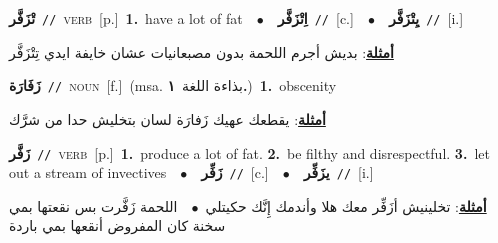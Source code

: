 \documentclass[10pt,a4paper,twoside]{article} %
\begin{document}
\begin{multicols}{2}
{\setlength\topsep{0pt}\textbf{\foreignlanguage{arabic}{تْزَفَّر}}\ {\color{gray}\texttt{//}\color{black}}\ \textsc{verb}\ [p.]\ \textbf{1.}~have a lot of fat\ \ $\bullet$\ \ \setlength\topsep{0pt}\textbf{\foreignlanguage{arabic}{اِتْزَفَّر}}\ {\color{gray}\texttt{//}\color{black}}\ [c.]\ \ $\bullet$\ \ \setlength\topsep{0pt}\textbf{\foreignlanguage{arabic}{يِتْزَفَّر}}\ {\color{gray}\texttt{//}\color{black}}\ [i.]\  \begin{flushright}\color{gray}\foreignlanguage{arabic}{\textbf{\underline{\foreignlanguage{arabic}{أمثلة}}}: بديش أجرم اللحمة بدون مصبعانيات عشان خايفة ايدي تِتْزَفَّر}\end{flushright}\color{black}} \vspace{2mm}

{\setlength\topsep{0pt}\textbf{\foreignlanguage{arabic}{زَفَارَة}}\ {\color{gray}\texttt{//}\color{black}}\ \textsc{noun}\ [f.]\ \color{gray}(msa. \foreignlanguage{arabic}{بذاءة اللغة}~\foreignlanguage{arabic}{\textbf{١.}})\color{black}\ \textbf{1.}~obscenity\  \begin{flushright}\color{gray}\foreignlanguage{arabic}{\textbf{\underline{\foreignlanguage{arabic}{أمثلة}}}: يقطعك عهيك زَفارَة لسان بتخليش حدا من شرَّك}\end{flushright}\color{black}} \vspace{2mm}

{\setlength\topsep{0pt}\textbf{\foreignlanguage{arabic}{زَفَّر}}\ {\color{gray}\texttt{//}\color{black}}\ \textsc{verb}\ [p.]\ \textbf{1.}~produce a lot of fat.  \textbf{2.}~be filthy and disrespectful.  \textbf{3.}~let out a stream of invectives\ \ $\bullet$\ \ \setlength\topsep{0pt}\textbf{\foreignlanguage{arabic}{زَفِّر}}\ {\color{gray}\texttt{//}\color{black}}\ [c.]\ \ $\bullet$\ \ \setlength\topsep{0pt}\textbf{\foreignlanguage{arabic}{يزَفِّر}}\ {\color{gray}\texttt{//}\color{black}}\ [i.]\  \begin{flushright}\color{gray}\foreignlanguage{arabic}{\textbf{\underline{\foreignlanguage{arabic}{أمثلة}}}: تخلينيش أزَفِّر معك هلا وأندمك إِنَّك حكيتلي\ $\bullet$\ \  اللحمة زَفَّرت بس نقعتها بمي سخنة كان المفروض أنقعها بمي باردة}\end{flushright}\color{black}} \vspace{2mm}


\end{multicols}
\end{document}
